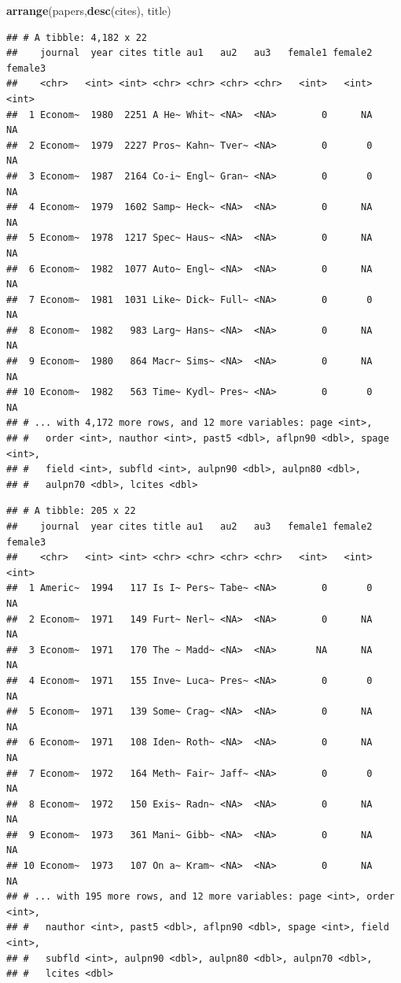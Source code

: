 \documentclass[]{book}
\newenvironment{Shaded}{\begin{snugshade}}{\end{snugshade}}
\newcommand{\KeywordTok}[1]{\textcolor[rgb]{0.13,0.29,0.53}{\textbf{#1}}}
\newcommand{\DecValTok}[1]{\textcolor[rgb]{0.00,0.00,0.81}{#1}}
\newcommand{\StringTok}[1]{\textcolor[rgb]{0.31,0.60,0.02}{#1}}
\newcommand{\OperatorTok}[1]{\textcolor[rgb]{0.81,0.36,0.00}{\textbf{#1}}}
\newcommand{\NormalTok}[1]{#1}
\theoremstyle{definition}
\theoremstyle{definition}
\theoremstyle{definition}
\theoremstyle{remark}
\begin{document}
\begin{Shaded}
\begin{Highlighting}[]
\KeywordTok{arrange}\NormalTok{(papers,}\KeywordTok{desc}\NormalTok{(cites), title)}
\end{Highlighting}
\end{Shaded}

\begin{verbatim}
## # A tibble: 4,182 x 22
##    journal  year cites title au1   au2   au3   female1 female2 female3
##    <chr>   <int> <int> <chr> <chr> <chr> <chr>   <int>   <int>   <int>
##  1 Econom~  1980  2251 A He~ Whit~ <NA>  <NA>        0      NA      NA
##  2 Econom~  1979  2227 Pros~ Kahn~ Tver~ <NA>        0       0      NA
##  3 Econom~  1987  2164 Co-i~ Engl~ Gran~ <NA>        0       0      NA
##  4 Econom~  1979  1602 Samp~ Heck~ <NA>  <NA>        0      NA      NA
##  5 Econom~  1978  1217 Spec~ Haus~ <NA>  <NA>        0      NA      NA
##  6 Econom~  1982  1077 Auto~ Engl~ <NA>  <NA>        0      NA      NA
##  7 Econom~  1981  1031 Like~ Dick~ Full~ <NA>        0       0      NA
##  8 Econom~  1982   983 Larg~ Hans~ <NA>  <NA>        0      NA      NA
##  9 Econom~  1980   864 Macr~ Sims~ <NA>  <NA>        0      NA      NA
## 10 Econom~  1982   563 Time~ Kydl~ Pres~ <NA>        0       0      NA
## # ... with 4,172 more rows, and 12 more variables: page <int>,
## #   order <int>, nauthor <int>, past5 <dbl>, aflpn90 <dbl>, spage <int>,
## #   field <int>, subfld <int>, aulpn90 <dbl>, aulpn80 <dbl>,
## #   aulpn70 <dbl>, lcites <dbl>
\end{verbatim}

\begin{Shaded}
\end{Shaded}

\begin{verbatim}
## # A tibble: 205 x 22
##    journal  year cites title au1   au2   au3   female1 female2 female3
##    <chr>   <int> <int> <chr> <chr> <chr> <chr>   <int>   <int>   <int>
##  1 Americ~  1994   117 Is I~ Pers~ Tabe~ <NA>        0       0      NA
##  2 Econom~  1971   149 Furt~ Nerl~ <NA>  <NA>        0      NA      NA
##  3 Econom~  1971   170 The ~ Madd~ <NA>  <NA>       NA      NA      NA
##  4 Econom~  1971   155 Inve~ Luca~ Pres~ <NA>        0       0      NA
##  5 Econom~  1971   139 Some~ Crag~ <NA>  <NA>        0      NA      NA
##  6 Econom~  1971   108 Iden~ Roth~ <NA>  <NA>        0      NA      NA
##  7 Econom~  1972   164 Meth~ Fair~ Jaff~ <NA>        0       0      NA
##  8 Econom~  1972   150 Exis~ Radn~ <NA>  <NA>        0      NA      NA
##  9 Econom~  1973   361 Mani~ Gibb~ <NA>  <NA>        0      NA      NA
## 10 Econom~  1973   107 On a~ Kram~ <NA>  <NA>        0      NA      NA
## # ... with 195 more rows, and 12 more variables: page <int>, order <int>,
## #   nauthor <int>, past5 <dbl>, aflpn90 <dbl>, spage <int>, field <int>,
## #   subfld <int>, aulpn90 <dbl>, aulpn80 <dbl>, aulpn70 <dbl>,
## #   lcites <dbl>
\end{verbatim}
\end{document}
